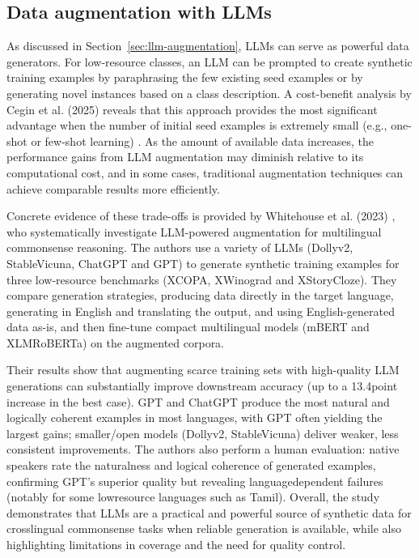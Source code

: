 \subsection{Data augmentation with LLMs}
As discussed in Section~\ref{sec:llm-augmentation}, LLMs can serve as powerful data generators. For low-resource classes, an LLM can be prompted to create synthetic training examples by paraphrasing the few existing seed examples or by generating novel instances based on a class description. A cost-benefit analysis by Cegin et al. (2025) reveals that this approach provides the most significant advantage when the number of initial seed examples is extremely small (e.g., one-shot or few-shot learning) \cite{cegin-etal-2025-llms}. As the amount of available data increases, the performance gains from LLM augmentation may diminish relative to its computational cost, and in some cases, traditional augmentation techniques can achieve comparable results more efficiently. \cite{cegin-etal-2025-llms}

Concrete evidence of these trade-offs is provided by Whitehouse et al. (2023) \cite{whitehouse2023llm}, who systematically investigate LLM-powered augmentation for multilingual commonsense reasoning. The authors use a variety of LLMs (Dolly\-v2, StableVicuna, ChatGPT and GPT) to generate synthetic training examples for three low-resource benchmarks (XCOPA, XWinograd and XStoryCloze). They compare generation strategies, producing data directly in the target language, generating in English and translating the output, and using English-generated data as-is, and then fine-tune compact multilingual models (mBERT and XLM\-RoBERTa) on the augmented corpora.

Their results show that augmenting scarce training sets with high-quality LLM generations can substantially improve downstream accuracy (up to a 13.4\-point increase in the best case). GPT and ChatGPT produce the most natural and logically coherent examples in most languages, with GPT often yielding the largest gains; smaller/open models (Dolly\-v2, StableVicuna) deliver weaker, less consistent improvements. The authors also perform a human evaluation: native speakers rate the naturalness and logical coherence of generated examples, confirming GPT's superior quality but revealing language\-dependent failures (notably for some low\-resource languages such as Tamil). Overall, the study demonstrates that LLMs are a practical and powerful source of synthetic data for cross\-lingual commonsense tasks when reliable generation is available, while also highlighting limitations in coverage and the need for quality control.
